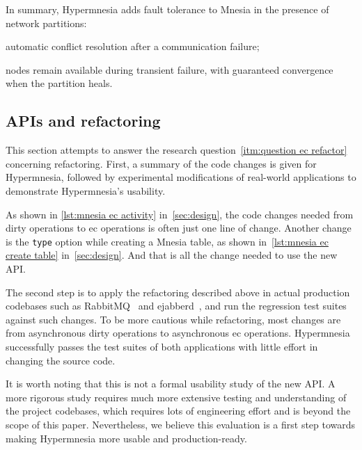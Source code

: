 In summary, Hypermnesia adds fault tolerance to Mnesia in the presence of network partitions:
\begin{enumerate*}
  \item automatic conflict resolution after a communication failure;
  \item nodes remain available during transient failure, with guaranteed convergence
  when the partition heals. 
\end{enumerate*}

\subsection{APIs and refactoring} \label{sec:eval api}

This section attempts to answer the research question~\cref{itm:question ec refactor} 
concerning refactoring. First, a summary of the code changes is given for Hypermnesia, 
followed by experimental modifications of real-world applications to demonstrate 
Hypermnesia's usability.

As shown in \cref{lst:mnesia ec activity} in~\cref{sec:design}, the code changes 
needed from dirty operations to \acrshort{ec} operations is often just one line 
of change. Another change is the \texttt{type} option while creating
a Mnesia table, as shown in~\cref{lst:mnesia ec create table} in~\cref{sec:design}. 
And that is all the change needed to use the new API\@. 

The second step is to apply the refactoring described above in actual production
codebases such as RabbitMQ~\cite{vmware2023rabbitmq} and 
ejabberd~\cite{processone2023ejabberd}, and run the regression test suites against
such changes. To be more cautious while refactoring, most changes
are from asynchronous dirty operations to asynchronous \acrshort{ec} operations. 
Hypermnesia successfully passes the test suites of both applications with little
effort in changing the source code.

It is worth noting that this is not a formal usability study of the new API.
A more rigorous study requires much more extensive testing and understanding
of the project codebases, which requires lots of engineering effort and is beyond
the scope of this paper. Nevertheless, we believe this evaluation is a first
step towards making Hypermnesia more usable and production-ready.

